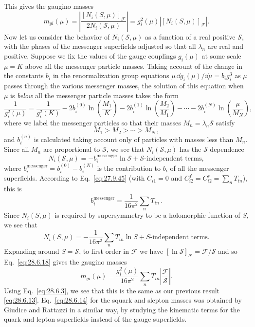 This gives the gaugino masses
\begin{equation}
  m_{gi}(\mu)
  =\left|
    \frac{[N_i(S,\mu)]_{\mathcal{F}}}{2N_i(\mathcal{S},\mu)}
  \right|
  =g_i^2(\mu)\left|[N_i(S,\mu)]_{\mathcal{F}}\right|.
  \tag{28.6.18}\label{eq:28.6.18}
\end{equation}
Now let us consider the behavior of \(N_i(\mathcal{S},\mu)\) as a function
of a real positive \(\mathcal{S}\), with the phases of the messenger
superfields adjusted so that all \(\lambda_n\) are real and positive.
Suppose we fix the values of the gauge couplings \(g_i(\mu)\) at some
scale \(\mu=K\) above all the messenger particle masses. Taking account
of the change in the constants \(b_i\) in the renormalization group
equations \(\mu\,\dd g_i(\mu)/\dd\mu=b_i g_i^3\) as \(\mu\) passes through the
various messenger masses, the solution of this equation when \(\mu\) is
\emph{below} all the messenger particle masses takes the form
\[
  \frac{1}{g_i^2(\mu)}
  =\frac{1}{g_i^2(K)}
   -2b_i^{(0)}\ln\left(\frac{M_1}{K}\right)
   -2b_i^{(1)}\ln\left(\frac{M_2}{M_1}\right)
   -\cdots
   -2b_i^{(N)}\ln\left(\frac{\mu}{M_N}\right),
\]
where we label the messenger particles so that their masses
\(M_n=\lambda_n\mathcal{S}\) satisfy
\[
  M_1>M_2>\cdots>M_N\,,
\]
and \(b_i^{(n)}\) is calculated taking account only of particles with
masses less than \(M_n\). Since all \(M_n\) are proportional to
\(\mathcal{S}\), we see that \(N_i(\mathcal{S},\mu)\) has the
\(\mathcal{S}\) dependence
\begin{equation}
  N_i(\mathcal{S},\mu)
  =-b_i^{\mathrm{messenger}}\ln\mathcal{S}
   +\mathcal{S}\text{-independent terms},
  \tag{28.6.19}\label{eq:28.6.19}
\end{equation}
where
\(b_i^{\mathrm{messenger}}=b_i^{(0)}-b_i^{(N)}\) is the contribution to
\(b_i\) of all the messenger superfields. According to
Eq.~\eqref{eq:27.9.45} (with \(C_{i1}=0\) and
\(C_{i2}^{f}=C_{i2}^{s}=\sum_nT_{in}\)), this is
\begin{equation}
  b_i^{\mathrm{messenger}}
  =\frac{1}{16\pi^2}\sum_nT_{in}\,.
  \tag{28.6.20}\label{eq:28.6.20}
\end{equation}
Since \(N_i(S,\mu)\) is required by supersymmetry to be a holomorphic
function of \(S\), we see that
\begin{equation}
  N_i(S,\mu)
  =-\frac{1}{16\pi^2}\sum_nT_{in}\ln S
   +S\text{-independent terms}.
  \tag{28.6.21}\label{eq:28.6.21}
\end{equation}
Expanding around \(S=\mathcal{S}\), to first order in \(\mathcal{F}\) we
have \([\ln\mathcal{S}]_{\mathcal{F}}=\mathcal{F}/\mathcal{S}\) and so
Eq.~\eqref{eq:28.6.18} gives the gaugino masses
\begin{equation}
  m_{gi}(\mu)
  =\frac{g_i^2(\mu)}{16\pi^2}\sum_nT_{in}
   \left|\frac{\mathcal{F}}{\mathcal{S}}\right|.
  \tag{28.6.22}\label{eq:28.6.22}
\end{equation}
Using Eq.~\eqref{eq:28.6.3}, we see that this is the same as our previous
result \eqref{eq:28.6.13}. Eq.~\eqref{eq:28.6.14} for the squark and
slepton masses was obtained by Giudice and Rattazzi in a similar way, by
studying the kinematic terms for the quark and lepton superfields instead
of the gauge superfields.

